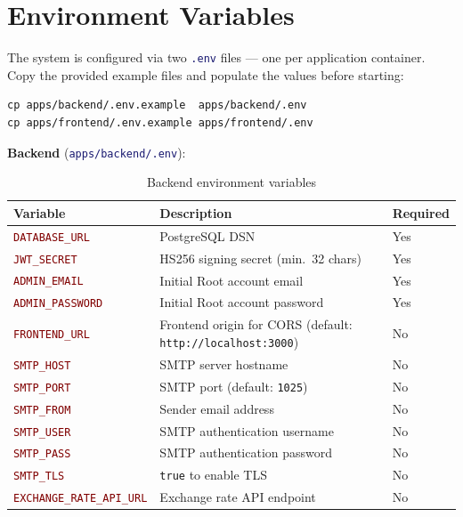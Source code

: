 \documentclass[12pt,a4paper,twoside]{report}
\newcommand{\code}[1]{\texttt{#1}}
\newcommand{\file}[1]{\texttt{\textcolor{MidnightBlue}{#1}}}
\newcommand{\env}[1]{\texttt{\textcolor{Maroon}{#1}}}
\begin{document}
\section{Environment Variables}

The system is configured via two \file{.env} files — one per application
container. Copy the provided example files and populate the values before
starting:

\begin{lstlisting}[style=bash]
cp apps/backend/.env.example  apps/backend/.env
cp apps/frontend/.env.example apps/frontend/.env
\end{lstlisting}

\textbf{Backend} (\file{apps/backend/.env}):

\begin{table}[H]
  \centering
  \caption{Backend environment variables}
  \begin{tabularx}{\linewidth}{@{}l>{\raggedright\arraybackslash}Xl@{}}
    \toprule
    \textbf{Variable} & \textbf{Description} & \textbf{Required} \\
    \midrule
    \env{DATABASE\_URL}       & PostgreSQL DSN                                     & Yes \\
    \env{JWT\_SECRET}         & HS256 signing secret (min.\ 32 chars)              & Yes \\
    \env{ADMIN\_EMAIL}        & Initial Root account email                         & Yes \\
    \env{ADMIN\_PASSWORD}     & Initial Root account password                      & Yes \\
    \env{FRONTEND\_URL}       & Frontend origin for CORS (default: \code{http://localhost:3000}) & No \\
    \env{SMTP\_HOST}          & SMTP server hostname                               & No  \\
    \env{SMTP\_PORT}          & SMTP port (default: \code{1025})                   & No  \\
    \env{SMTP\_FROM}          & Sender email address                               & No  \\
    \env{SMTP\_USER}          & SMTP authentication username                       & No  \\
    \env{SMTP\_PASS}          & SMTP authentication password                       & No  \\
    \env{SMTP\_TLS}           & \code{true} to enable TLS                         & No  \\
    \env{EXCHANGE\_RATE\_API\_URL} & Exchange rate API endpoint                    & No  \\
    \bottomrule
  \end{tabularx}
\end{table}
\end{document}
